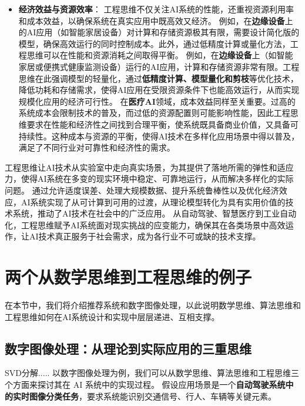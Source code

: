 \begin{itemize}
\item {\bf 经济效益与资源效率}：
工程思维不仅关注AI系统的性能，还重视资源利用率和成本效益，以确保系统在真实应用中既高效又经济。
例如，在{\bf 边缘设备}上的AI应用（如智能家居设备）对计算和存储资源极其有限，需要设计简化版的模型，确保高效运行的同时控制成本。此外，通过低精度计算或量化方法，工程思维可以在性能和资源消耗之间取得平衡。
例如，在{\bf 边缘设备}上（如智能家居或便携式健康监测设备）运行的AI应用，计算和存储资源非常有限。工程思维在此强调模型的轻量化，通过{\bf 低精度计算、模型量化和剪枝}等优化技术，降低功耗和存储需求，使得AI应用在受限资源条件下也能高效运行，从而实现规模化应用的经济可行性。
在{\bf 医疗AI}领域，成本效益同样至关重要。过高的系统成本会限制技术的普及，而过低的资源配置则可能影响性能，因此工程思维要求在性能和经济性之间找到合理平衡，使系统既具备商业价值，又具备可持续性。这种成本与资源的平衡，使得AI技术在多样化应用场景中得以普及，满足了不同行业对可靠性和经济性的需求。
\end{itemize}
工程思维让AI技术从实验室中走向真实场景，为其提供了落地所需的弹性和适应力，使得AI系统在多变的现实环境中稳定、可靠地运行，从而解决多样化的实际问题。
通过允许适度误差、处理大规模数据、提升系统鲁棒性以及优化经济效应，AI系统实现了从可计算到可用的过渡，从理论模型转化为具有实用价值的技术系统，推动了AI技术在社会中的广泛应用。
从自动驾驶、智慧医疗到工业自动化，工程思维赋予AI系统面对现实挑战的应变能力，确保其在各类场景中高效运作，让AI技术真正服务于社会需求，成为各行业不可或缺的技术支撑。
\section{两个从数学思维到工程思维的例子}



在本节中，我们将介绍推荐系统和数字图像处理，以此说明数学思维、算法思维和工程思维如何在AI系统设计和实现中层层递进、互相支撑。
\subsection{ 数字图像处理：从理论到实际应用的三重思维}


SVD分解.....
以数字图像处理为例，我们可以从数学思维、算法思维和工程思维三个方面来探讨其在 AI 系统中的实现过程。
假设应用场景是一个{\bf 自动驾驶系统中的实时图像分类任务}，要求系统能识别交通信号、行人、车辆等关键元素。
